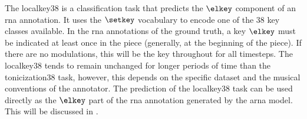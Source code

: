 
The \gls{localkey38} is a classification task that predicts
the $\elkey$ component of an \gls{rna} annotation. It uses
the $\setkey$ vocabulary to encode one of the 38 key classes
available. In the \gls{rna} annotations of the ground truth,
a key $\elkey$ must be indicated at least once in the piece
(generally, at the beginning of the piece). If there are no
modulations, this will be the key throughout for all
timesteps. The \gls{localkey38} tends to remain unchanged
for longer periods of time than the \gls{tonicization38}
task, however, this depends on the specific dataset and the
musical conventions of the annotator. The prediction of the
\gls{localkey38} task can be used directly as the $\elkey$
part of the \gls{rna} annotation generated by the \gls{arna}
model. This will be discussed in .


